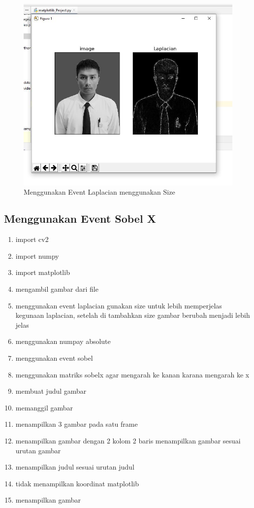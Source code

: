\newpage
\begin{figure}[ht]
\centering
\includegraphics[scale=0.6]{figures/2,65.jpg}
\caption{Menggunakan Event Laplacian menggunakan Size}
\label{contoh}
\end{figure}








\newpage
\subsection{Menggunakan Event Sobel X}

\begin{enumerate}
	\item import cv2
	\item import numpy
	\item import matplotlib
	\item mengambil gambar dari file
	\item menggunakan event laplacian gunakan size untuk lebih memperjelas kegunaan laplacian, setelah di tambahkan size gambar berubah menjadi lebih jelas
	\item menggunakan numpay absolute
	\item menggunakan event sobel
	\item menggunakan matriks sobelx agar mengarah ke kanan karana mengarah ke x
	\item membuat judul gambar
	\item memanggil gambar
	\item menampilkan 3 gambar pada satu frame
	\item menampilkan gambar dengan 2 kolom 2 baris menampilkan gambar sesuai urutan gambar
	\item menampilkan judul sesuai urutan judul
	\item tidak menampilkan koordinat matplotlib
	\item menampilkan gambar
\end{enumerate}

